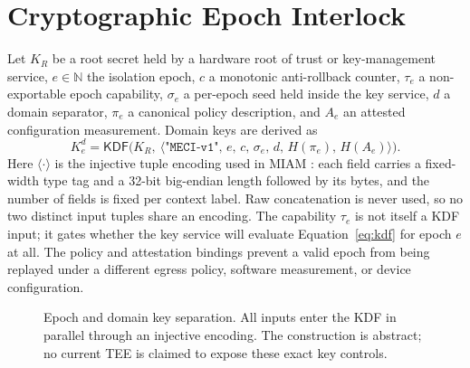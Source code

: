 \documentclass[11pt,letterpaper]{article}
\theoremstyle{plain}
\theoremstyle{definition}
\newcommand{\KDF}{\mathsf{KDF}}
\newcommand{\enc}[1]{\langle #1\rangle}
\begin{document}
\section{Cryptographic Epoch Interlock}\label{sec:epoch}

Let $K_R$ be a root secret held by a hardware root of trust or key-management service, $e \in \mathbb{N}$ the isolation epoch, $c$ a monotonic anti-rollback counter, $\tau_e$ a non-exportable epoch capability, $\sigma_e$ a per-epoch seed held inside the key service, $d$ a domain separator, $\pi_e$ a canonical policy description, and $A_e$ an attested configuration measurement. Domain keys are derived as
\begin{equation}\label{eq:kdf}
K^{d}_{e} = \KDF\big(K_R,\ \enc{\texttt{"MECI-v1"},\, e,\, c,\, \sigma_e,\, d,\, H(\pi_e),\, H(A_e)}\big).
\end{equation}
Here $\enc{\cdot}$ is the injective tuple encoding used in MIAM \cite{miam}: each field carries a fixed-width type tag and a 32-bit big-endian length followed by its bytes, and the number of fields is fixed per context label. Raw concatenation is never used, so no two distinct input tuples share an encoding. The capability $\tau_e$ is not itself a KDF input; it gates whether the key service will evaluate Equation~\eqref{eq:kdf} for epoch $e$ at all. The policy and attestation bindings prevent a valid epoch from being replayed under a different egress policy, software measurement, or device configuration.

\begin{figure}[t]
\centering
{}
\caption{Epoch and domain key separation. All inputs enter the KDF in parallel through an injective encoding. The construction is abstract; no current TEE is claimed to expose these exact key controls.}
\label{fig:kdf}
\end{figure}
\end{document}
